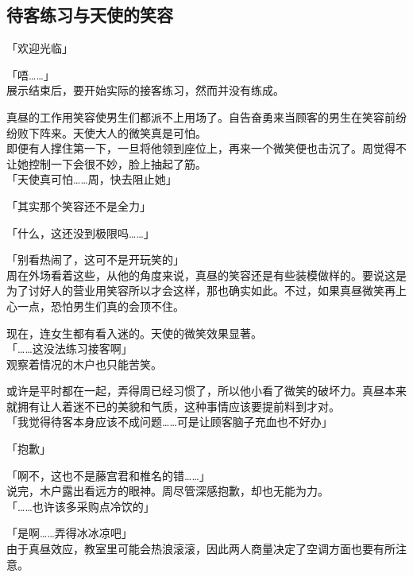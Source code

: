 \subsection{待客练习与天使的笑容}

「欢迎光临」

「唔……」\\

展示结束后，要开始实际的接客练习，然而并没有练成。

真昼的工作用笑容使男生们都派不上用场了。自告奋勇来当顾客的男生在笑容前纷纷败下阵来。天使大人的微笑真是可怕。\\

即便有人撑住第一下，一旦将他领到座位上，再来一个微笑便也击沉了。周觉得不让她控制一下会很不妙，脸上抽起了筋。\\

「天使真可怕……周，快去阻止她」

「其实那个笑容还不是全力」

「什么，这还没到极限吗……」

「别看热闹了，这可不是开玩笑的」\\

周在外场看着这些，从他的角度来说，真昼的笑容还是有些装模做样的。要说这是为了讨好人的营业用笑容所以才会这样，那也确实如此。不过，如果真昼微笑再上心一点，恐怕男生们真的会顶不住。

现在，连女生都有看入迷的。天使的微笑效果显著。\\

「……这没法练习接客啊」\\

观察着情况的木户也只能苦笑。

或许是平时都在一起，弄得周已经习惯了，所以他小看了微笑的破坏力。真昼本来就拥有让人着迷不已的美貌和气质，这种事情应该要提前料到才对。\\

「我觉得待客本身应该不成问题……可是让顾客脑子充血也不好办」

「抱歉」

「啊不，这也不是藤宫君和椎名的错……」\\

说完，木户露出看远方的眼神。周尽管深感抱歉，却也无能为力。\\

「……也许该多采购点冷饮的」

「是啊……弄得冰冰凉吧」\\

由于真昼效应，教室里可能会热浪滚滚，因此两人商量决定了空调方面也要有所注意。\\

